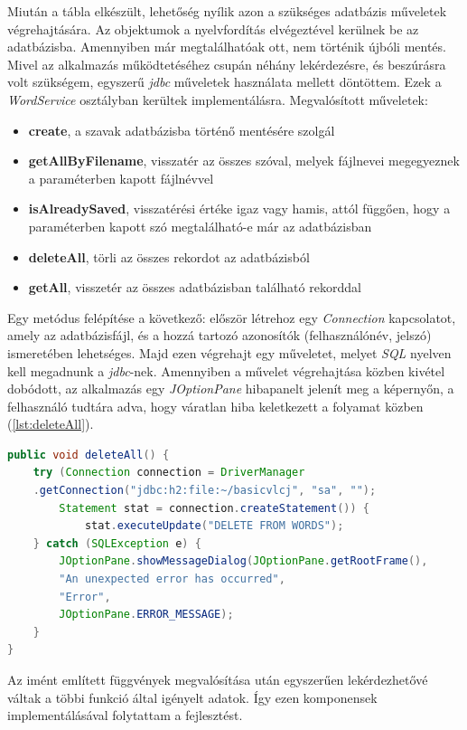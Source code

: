 Miután a tábla elkészült, lehetőség nyílik azon a szükséges adatbázis műveletek végrehajtására. Az objektumok a nyelvfordítás elvégeztével kerülnek be az adatbázisba. Amennyiben már megtalálhatóak ott, nem történik újbóli mentés. Mivel az alkalmazás működtetéséhez csupán néhány lekérdezésre, és beszúrásra volt szükségem, egyszerű \textit{jdbc} műveletek használata mellett döntöttem. Ezek a \textit{WordService} osztályban kerültek implementálásra. Megvalósított műveletek:
\begin{itemize}
\item \textbf{create}, a szavak adatbázisba történő mentésére szolgál
\item \textbf{getAllByFilename}, visszatér az összes szóval, melyek fájlnevei megegyeznek a paraméterben kapott fájlnévvel
\item \textbf{isAlreadySaved}, visszatérési értéke igaz vagy hamis, attól függően, hogy a paraméterben kapott szó megtalálható-e már az adatbázisban
\item \textbf{deleteAll}, törli az összes rekordot az adatbázisból
\item \textbf{getAll}, visszetér az összes adatbázisban található rekorddal
\end{itemize}
Egy metódus felépítése a következő: először létrehoz egy \textit{Connection} kapcsolatot, amely az adatbázisfájl, és a hozzá tartozó azonosítók (felhasználónév, jelszó) ismeretében lehetséges. Majd ezen végrehajt egy műveletet, melyet \textit{SQL} nyelven kell megadnunk a \textit{jdbc}-nek. Amennyiben a művelet végrehajtása közben kivétel dobódott, az alkalmazás egy \textit{JOptionPane} hibapanelt jelenít meg a képernyőn, a felhasználó tudtára adva, hogy váratlan hiba keletkezett a folyamat közben (\ref{lst:deleteAll}).

\begin{lstlisting}[caption=Implementált deleteAll metódus, language=java, label={lst:deleteAll}]
public void deleteAll() {
    try (Connection connection = DriverManager
    .getConnection("jdbc:h2:file:~/basicvlcj", "sa", "");
        Statement stat = connection.createStatement()) {
            stat.executeUpdate("DELETE FROM WORDS");
    } catch (SQLException e) {
        JOptionPane.showMessageDialog(JOptionPane.getRootFrame(),
        "An unexpected error has occurred",
        "Error",
        JOptionPane.ERROR_MESSAGE);
    }
}
\end{lstlisting}

Az imént említett függvények megvalósítása után egyszerűen lekérdezhetővé váltak a többi funkció által igényelt adatok. Így ezen komponensek implementálásával folytattam a fejlesztést.
